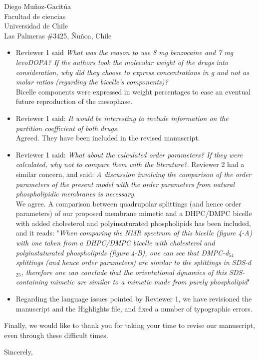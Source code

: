 \documentclass{letter}
\begin{document}
\begin{letter}{Diego Muñoz-Gacitúa\\ Facultad de ciencias \\ Universidad de
    Chile \\ Las Palmeras \#3425, Ñuñoa, Chile}
\begin{itemize}
\item Reviewer 1 said \textit{What was the reason to use 8 mg benzocaine and 7 mg levoDOPA? If the authors took the molecular weight of the drugs into consideration, why did they choose to express concentrations in g and not as molar ratios (regarding the bicelle’s components)?}\\
Bicelle components were expressed in weight percentages to ease an eventual future reproduction of the mesophase.
\item Reviewer 1 said: \textit{It would be interesting to include information on the partition coefficient of both drugs.}\\
  Agreed. They have been included in the revised manuscript.
  
  \item Reviewer 1 said: \textit{What about the calculated order parameters? If they were calculated, why not to compare them with the literature?}. Reviewer 2 had a similar concern, and said: \textit{A discussion involving the comparison of the order parameters of the present model with the order parameters from natural phospholipidic membranes is necessary.}\\
  We agree. A comparison between quadrupolar splittings (and hence order parameters) of our proposed membrane mimetic and a DHPC/DMPC bicelle with added cholesterol and polyinsaturated phospholipids has been included, and it reads: "\textit{When comparing the NMR spectrum of this bicelle (figure 4-A) with one taken from a DHPC/DMPC bicelle with cholesterol and polyinstaturated phospholipids (figure 4-B), one can see that DMPC-d$_{54}$ splittings (and hence order parameters) are similar to the splittings in SDS-d$_{25}$, therefore one can conclude that the orientational dynamics of this SDS-containing mimetic are similar to a mimetic made from purely phospholipid}"
  
	\item Regarding the language issues pointed by Reviewer 1, we have revisioned the manuscript and the Highlights file, and fixed a number of typographic errors.
 \end{itemize}

   Finally, we would like to thank you for taking your time to revise our
   manuscript, even through these difficult times.

   \closing{Sincerely,}

 \end{letter}
 
\end{document}
